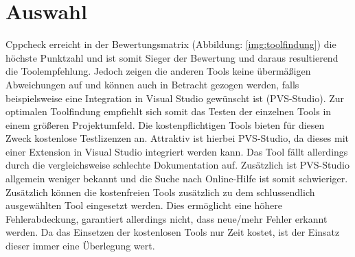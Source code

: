 \section{Auswahl}
\label{sec:auswahl}

Cppcheck erreicht in der Bewertungsmatrix (Abbildung: \ref{img:toolfindung}) die höchste Punktzahl und ist somit Sieger der Bewertung und daraus resultierend die Toolempfehlung. 
Jedoch zeigen die anderen Tools keine übermäßigen Abweichungen auf und können auch in Betracht gezogen werden, falls beispielsweise eine Integration in Visual Studio gewünscht ist 
(PVS-Studio). \newline
Zur optimalen Toolfindung empfiehlt sich somit das Testen der einzelnen Tools in einem größeren Projektumfeld. Die kostenpflichtigen Tools bieten für diesen Zweck kostenlose 
Testlizenzen an. Attraktiv ist hierbei PVS-Studio, da dieses mit einer Extension in Visual Studio integriert werden kann. Das Tool fällt allerdings durch die vergleichsweise 
schlechte Dokumentation auf. Zusätzlich ist PVS-Studio allgemein weniger bekannt und die Suche nach Online-Hilfe ist somit schwieriger. \newline
Zusätzlich können die kostenfreien Tools zusätzlich zu dem schlussendlich ausgewählten Tool eingesetzt werden. Dies ermöglicht eine höhere Fehlerabdeckung, garantiert allerdings nicht, 
dass neue/mehr Fehler erkannt werden. Da das Einsetzen der kostenlosen Tools nur Zeit kostet, ist der Einsatz dieser immer eine Überlegung wert.